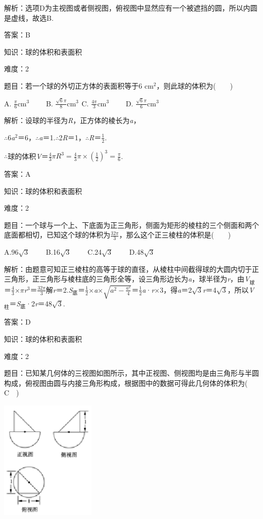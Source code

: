 \documentclass{article} %
\begin{document}
解析：选项D为主视图或者侧视图，俯视图中显然应有一个被遮挡的圆，所以内圆是虚线，故选B.

答案：B

知识：球的体积和表面积

难度：2

题目：若一个球的外切正方体的表面积等于6 cm${}^{2}$，则此球的体积为(　　)

A. $\frac{\pi}{6}$cm${}^{3}$　　 B. $\frac{\sqrt{6}\pi}{8}$cm${}^{3}$${}^{ }$  C. $\frac{4\pi}{3}$cm${}^{3}$　　 D. $\frac{\sqrt{6}\pi}{6}$cm${}^{3}$

解析：设球的半径为\textit{R}，正方体的棱长为\textit{a}，



$\mathrm{\therefore}$6\textit{a}${}^{2}$＝6，$\mathrm{\therefore}$\textit{a}＝1.$\mathrm{\therefore}$2\textit{R}＝1，$\mathrm{\therefore}$\textit{R}＝$\frac{1}{2}$.

$\mathrm{\therefore}$球的体积\textit{V}＝$\frac{4}{3}\pi R^3=\frac{4}{3}\pi \times(\frac{1}{2})^3=\frac{\pi}{6}$.

答案：A

知识：球的体积和表面积

难度：2

题目：一个球与一个上、下底面为正三角形，侧面为矩形的棱柱的三个侧面和两个底面都相切，已知这个球的体积为$\frac{32\pi}{3}$，那么这个正三棱柱的体积是(　　)

A.96$\sqrt{3}$　　 B.16$\sqrt{3}$　　 C.24$\sqrt{3}$　　 D.48$\sqrt{3}$

解析：由题意可知正三棱柱的高等于球的直径，从棱柱中间截得球的大圆内切于正三角形，正三角形与棱柱底的三角形全等，设三角形边长为\textit{a}，球半径为\textit{r}，由\textit{V}${}_{\textrm{球}}$＝$\frac{4}{3}\mathrm{\times}$$\pi$\textit{r}${}^{3}$＝$\frac{32\pi}{3}$解\textit{r}＝2.\textit{S}${}_{\textrm{底}}$＝$\frac{1}{2}\mathrm{\times}$\textit{a}$\mathrm{\times}\sqrt{a^2-\frac{a^2}{4}}$＝$\frac{1}{2}$\textit{a}·\textit{r}$\mathrm{\times}$3，得\textit{a}＝2$\sqrt{3}$\textit{r}＝4$\sqrt{3}$，所以\textit{V}${}_{\textrm{柱}}$＝\textit{S}${}_{\textrm{底}}$·2\textit{r}＝48$\sqrt{3}$.

答案：D

知识：球的体积和表面积

难度：2

题目：已知某几何体的三视图如图所示，其中正视图、侧视图均是由三角形与半圆构成，俯视图由圆与内接三角形构成，根据图中的数据可得此几何体的体积为(　C　)

\includegraphics*[width=1.80in, height=2.28in, keepaspectratio=false]{image80}
\end{document}
